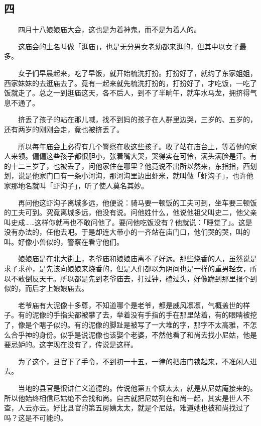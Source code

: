 \documentclass[UTF8]{ctexart}
\begin{document}
\subsection{四}

　　四月十八娘娘庙大会，这也是为着神鬼，而不是为着人的。

　　这庙会的土名叫做「逛庙」，也是无分男女老幼都来逛的，但其中以女子最多。

　　女子们早晨起来，吃了早饭，就开始梳洗打扮。打扮好了，就约了东家姐姐，西家妹妹的去逛庙去了。竟有一起来就先梳洗打扮的，打扮好了，才吃饭，一吃了饭就走了。总之一到逛庙这天，各不后人，到不了半晌午，就车水马龙，拥挤得气息不通了。

　　挤丢了孩子的站在那儿喊，找不到妈的孩子在人群里边哭，三岁的、五岁的，还有两岁的刚刚会走，竟也被挤丢了。

　　所以每年庙会上必得有几个警察在收这些孩子。收了站在庙台上，等着他的家人来领。偏偏这些孩子都很胆小，张着嘴大哭，哭得实在可怜，满头满脸是汗。有的十二三岁了，也被丢了，问他家住在哪里？他竟说不出所以然来，东指指，西划划，说是他家门口有一条小河沟，那河沟里边出虾米，就叫做「虾沟子」，也许他家那地名就叫「虾沟子」，听了使人莫名其妙。

　　再问他这虾沟子离城多远，他便说：骑马要一顿饭的工夫可到，坐车要三顿饭的工夫可到。究竟离城多远，他没有说。问他姓什么，他说他祖父叫史二，他父亲叫史成……这样你就再也不敢问他了。要问他吃饭没有？他就说：「睡觉了」。这是没有办法的，任他去吧。于是却连大带小的一齐站在庙门口，他们哭的哭，叫的叫。好像小兽似的，警察在看守他们。

　　娘娘庙是在北大街上，老爷庙和娘娘庙离不了好远。那些烧香的人，虽然说是求子求孙，是先该向娘娘来烧香的，但是人们都以为阴间也是一样的重男轻女，所以不敢倒反天干。所以都是先到老爷庙去，打过钟，磕过头，好像跪到那里报个到似的，而后才上娘娘庙去。

　　老爷庙有大泥像十多尊，不知道哪个是老爷，都是威风凛凛，气概盖世的样子。有的泥像的手指尖都被攀了去，举着没有手指的手在那里站着，有的眼睛被挖了，像是个瞎子似的。有的泥像的脚趾是被写了一大堆的字，那字不太高雅，不怎么合乎神的身份。似乎是说泥像也该娶个老婆，不然他看了和尚去找小尼姑，他是要忌妒的。这字现在没有了，传说是这样。

　　为了这个，县官下了手令，不到初一十五，一律的把庙门锁起来，不准闲人进去。

　　当地的县官是很讲仁义道德的。传说他第五个姨太太，就是从尼姑庵接来的。所以他始终相信尼姑绝不会找和尚。自古就把尼姑列在和尚一起，其实是世人不查，人云亦云。好比县官的第五房姨太太，就是个尼姑。难道她也被和尚找过了吗？这是不可能的。
\end{document}
